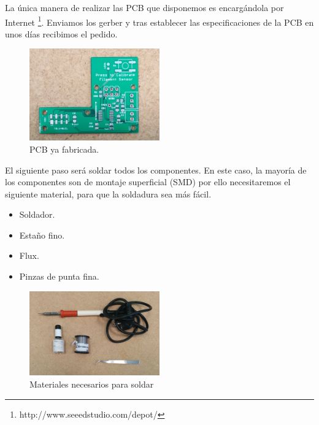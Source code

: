 La única manera de realizar las PCB que disponemos es encargándola por Internet \footnote{http://www.seeedstudio.com/depot/}. Enviamos los gerber y tras establecer las especificaciones de la PCB en unos días recibimos el pedido.\\
\begin{figure}[H]
    \centering
    \includegraphics[width=0.5\textwidth]{images/sensor/IMG_20150414_105219_.jpg}
    \caption{PCB ya fabricada.}
    \label{fig:sens_pcb}
\end{figure}

El siguiente paso será soldar todos los componentes. En este caso, la mayoría de los componentes son de montaje superficial (SMD) por ello necesitaremos el siguiente material, para que la soldadura sea más fácil.

\begin{itemize}
	\item{Soldador.}
	\item{Estaño fino.}
	\item{Flux.}
	\item{Pinzas de punta fina.}
\end{itemize}

\begin{figure}[H]
    \centering
    \includegraphics[width=0.5\textwidth]{images/sensor/IMG_20150417_160216.jpg}
    \caption{Materiales necesarios para soldar}
    \label{fig:sens_materiales}
\end{figure}

